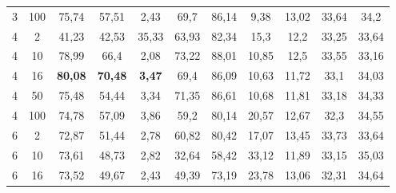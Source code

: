 \begin{table}[ht]
\begin{tabular}{cc|ccc|ccc|ccc}
        {3}                           & {100}  & {75,74}                             & {57,51}                             & {2,43}                                   & {69,7}           & {86,14}          & {9,38}          & {13,02}       & {33,64}     & {34,2}      \\
        {4}                           & {2}    & {41,23}                             & {42,53}                             & {35,33}                                  & {63,93}          & {82,34}          & {15,3}          & {12,2}        & {33,25}     & {33,64}     \\
        {4}                           & {10}   & {78,99}                             & {66,4}                              & {2,08}                                   & {73,22}          & {88,01}          & {10,85}         & {12,5}        & {33,55}     & {33,16}     \\
        {4}                           & {16}   & {\textbf{80,08}}                    & {\textbf{70,48}}                    & {\textbf{3,47}}                          & {69,4}           & {86,09}          & {10,63}         & {11,72}       & {33,1}      & {34,03}     \\
        {4}                           & {50}   & {75,48}                             & {54,44}                             & {3,34}                                   & {71,35}          & {86,61}          & {10,68}         & {11,81}       & {33,18}     & {34,33}     \\
        {4}                           & {100}  & {74,78}                             & {57,09}                             & {3,86}                                   & {59,2}           & {80,14}          & {20,57}         & {12,67}       & {32,3}      & {34,55}     \\
        {6}                           & {2}    & {72,87}                             & {51,44}                             & {2,78}                                   & {60,82}          & {80,42}          & {17,07}         & {13,45}       & {33,73}     & {33,64}     \\
        {6}                           & {10}   & {73,61}                             & {48,73}                             & {2,82}                                   & {32,64}          & {58,42}          & {33,12}         & {11,89}       & {33,15}     & {35,03}     \\
        {6}                           & {16}   & {73,52}                             & {49,67}                             & {2,43}                                   & {49,39}          & {73,19}          & {23,78}         & {13,06}       & {32,31}     & {34,64}     \\

\end{tabular}
\end{table}
